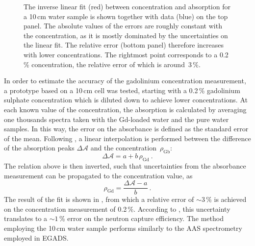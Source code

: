 \begin{figure}
	\centering
	\resizebox{0.8\textwidth}{!}{}
	\caption[Linear fit between Gd concentration and absorption with a 10\,cm water sample]%
		{The inverse linear fit (red) between concentration and absorption for a 10\,cm water sample %
		is shown together with data (blue) on the top panel.
		The absolute values of the errors are roughly constant with the concentration, %
		as it is mostly dominated by the uncertainties on the linear fit.
		The relative error (bottom panel) therefore increases with lower concentrations.
		The rightmost point corresponds to a 0.2\,\% concentration, the relative error %
		of which is around~3\,\%.}
	\label{fig:gad_10cm}
\end{figure}


In order to estimate the accuracy of the gadolinium concentration measurement, %
a prototype based on a 10\,cm cell was tested, starting with a 0.2\,\% gadolinium sulphate concentration %
which is diluted down to achieve lower concentrations.
At each known value of the concentration, the absorption is calculated by averaging one thousands spectra %
taken with the Gd-loaded water and the pure water samples.
In this way, the error on the absorbance is defined as the standard error of the mean.
Following , a linear interpolation is performed between the difference of the absorption peaks %
$\Delta \mathcal{A}$ and the concentration~$\rho_\text{Gb}$: 
\begin{equation}
	\Delta \mathcal{A} = a + b\,\rho_\text{Gd}\ .
\end{equation}
The relation above is then inverted, such that uncertainties from the absorbance measurement %
can be propagated to the concentration value, as
\begin{equation}
	\rho_\text{Gd} = \frac{\Delta \mathcal{A} - a}{b}\ .
\end{equation}
The result of the fit is shown in , from which a relative error of $\sim3$\,\% %
is achieved on the concentration measurement of 0.2\,\%.
According to , this uncertainty translates to a $\sim1$\,\% error on the neutron capture efficiency.
The method employing the 10\,cm water sample performs similarly to the AAS spectrometry employed in EGADS.


